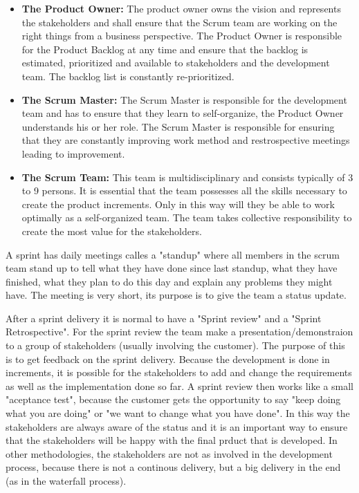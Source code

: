 \begin{itemize}
    \item {\bf The Product Owner: }The product owner owns the vision and represents the stakeholders
    and shall ensure that the Scrum team are working on the right things from a 
    business perspective. The Product Owner is responsible for the Product Backlog 
    at any time and ensure that the backlog is estimated, prioritized and available to 
    stakeholders and the development team. The backlog list is constantly re-prioritized. 
    \item {\bf The Scrum Master: }The Scrum Master is responsible for the development team and has 
    to ensure that they learn to self-organize, the Product Owner understands his or her role.
    The Scrum Master is responsible for ensuring that they are constantly improving work method 
    and restrospective meetings leading to improvement.
    \item {\bf The Scrum Team: }This team is multidisciplinary and consists typically of 3 to 9 persons.
    It is essential that the team possesses all the skills necessary to create the product increments. 
    Only in this way will they be able to work optimally as a self-organized team. The team takes 
    collective responsibility to create the most value for the stakeholders.
\end{itemize}

A sprint has daily meetings calles a "standup" where all members in the scrum team stand up
to tell what they have done since last standup, what they have finished, what they plan to do this day and
explain any problems they might have. The meeting is very short, its purpose is to give the team a status
update.

After a sprint delivery it is normal to have a "Sprint review" and a "Sprint Retrospective".
For the sprint review the team make a presentation/demonstraion to a group of stakeholders (usually involving the
customer). The purpose of this is to get feedback on the sprint delivery. Because the development
is done in increments, it is possible for the stakeholders to add and change the requirements as well as the implementation done so far. A sprint review then works like a small "aceptance test", because the customer gets the opportunity to say "keep doing what you are doing" or "we want to change what you have done". In this way the stakeholders are always aware of the status and it is an important
way to ensure that the stakeholders will be happy with the final prduct that is developed. 
In other methodologies, the stakeholders are not as involved in the development process, because there is not a 
continous delivery, but a big delivery in the end (as in the waterfall process).

